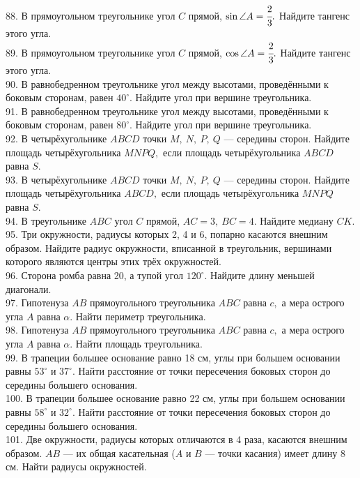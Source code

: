 \documentclass[12pt]{article}
\begin{document}
88. В прямоугольном треугольнике угол $C$ прямой, $\sin \angle A=\cfrac{2}{3}.$ Найдите тангенс этого угла.\\
89. В прямоугольном треугольнике угол $C$ прямой, $\cos \angle A=\cfrac{2}{3}.$ Найдите тангенс этого угла.\\
90. В равнобедренном треугольнике угол между высотами, проведёнными к боковым сторонам, равен $40^\circ.$ Найдите угол при вершине треугольника.\\
91. В равнобедренном треугольнике угол между высотами, проведёнными к боковым сторонам, равен $80^\circ.$ Найдите угол при вершине треугольника.\\
92. В четырёхугольнике $ABCD$ точки $M,\ N,\ P,\ Q$ --- середины сторон. Найдите площадь четырёхугольника $MNPQ,$ если площадь четырёхугольника $ABCD$ равна $S.$\\
93. В четырёхугольнике $ABCD$ точки $M,\ N,\ P,\ Q$ --- середины сторон. Найдите площадь четырёхугольника $ABCD,$ если площадь четырёхугольника $MNPQ$ равна $S.$\\
94. В треугольнике $ABC$ угол $C$ прямой, $AC=3,\ BC=4.$ Найдите медиану $CK.$\\
95. Три окружности, радиусы которых 2, 4 и 6, попарно касаются внешним образом. Найдите радиус окружности, вписанной в треугольник, вершинами которого являются центры этих трёх окружностей.\\
96. Сторона ромба равна 20, а тупой угол $120^\circ.$ Найдите длину меньшей диагонали.\\
97. Гипотенуза $AB$ прямоугольного треугольника $ABC$ равна $c,$ а мера острого угла $A$ равна $\alpha.$ Найти периметр треугольника.\\
98. Гипотенуза $AB$ прямоугольного треугольника $ABC$ равна $c,$ а мера острого угла $A$ равна $\alpha.$ Найти площадь треугольника.\\
99. В трапеции большее основание равно 18 см, углы при большем основании равны $53^\circ$ и $37^\circ.$ Найти расстояние от точки пересечения боковых сторон до середины большего основания.\\
100. В трапеции большее основание равно 22 см, углы при большем основании равны $58^\circ$ и $32^\circ.$ Найти расстояние от точки пересечения боковых сторон до середины большего основания.\\
101. Две окружности, радиусы которых отличаются в 4 раза, касаются внешним образом. $AB$ --- их общая касательная ($A$ и $B$ --- точки касания) имеет длину 8 см. Найти радиусы окружностей.\\
\end{document}
